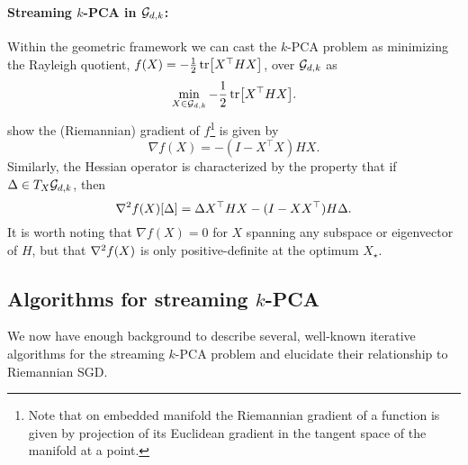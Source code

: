 \paragraph{Streaming $k$-PCA in $\mathcal{G}_{d,k}$:} Within the geometric framework we can cast the $k$-PCA problem as minimizing the Rayleigh quotient, $f(X) = -\frac{1}{2} \tr [X^\top H X]$, over $\mathcal{G}_{d,k}$ as
\[\min _{X \in \mathcal{G}_{d,k}} -\frac{1}{2} \tr [X^\top H X].\]
  \citet{edelman1998geometry} show the (Riemannian) gradient of $f$\footnote{Note that on embedded manifold the Riemannian gradient of a function is given by projection of its Euclidean gradient in the tangent space of the manifold at a point.} is given by
  \[\nabla f (X)=-(I-X^\top X) H X.\]
 Similarly, the Hessian operator is characterized by the property that if $\Delta\in T_X\mathcal{G}_{d,k}$, then
\[\nabla^2 f (X)[\Delta] =\Delta X^\top H X-(I -X X^\top)H\Delta.\]
It is worth noting that $\nabla f (X) = 0$ for $X$ spanning any subspace or eigenvector of $H$, but that $\nabla^2 f(X)$ is only positive-definite at the optimum $X_\star$.

\subsection{Algorithms for streaming $k$-PCA} \label{sec:alg_stream}

We now have enough background to describe several, well-known iterative  algorithms for the streaming $k$-PCA problem and elucidate their relationship to Riemannian SGD.

